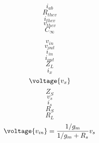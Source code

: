 \documentclass[letterpaper 12pt]{book}
\begin{document}
\[ i_{ab} \]
 \[ R_{thev} \]
 \[ i_{thev} \]
 \[ v_{thev} \]
 \[ C_\infty \]
 
 \[ v_{in} \]
 \[ v_{out} \]
 \[ i_{in} \]
 \[ i_{out} \]
 \[ Z_L \]
 \[ i_x \]
 \[ \voltage{v_x} \]
 \[ Z_S \]
 \[ v_s \]
 \[ i_s \]
 \[ R_S \]
 \[ R_L \]
 \[ \voltage{v_{in}} = \frac{1/g_m}{1/g_m + R_s}v_s  \]
\end{document}
